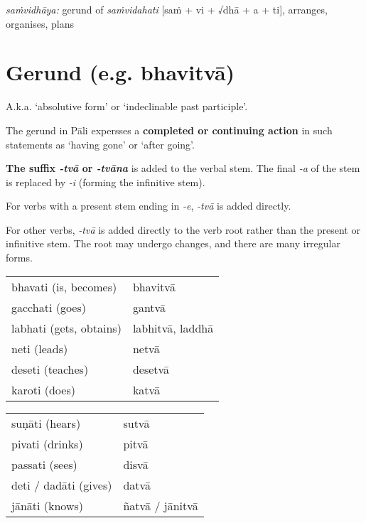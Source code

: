 \documentclass[11pt,oneside]{memoir}
\begin{document}
\emph{saṁvidhāya:} gerund of \emph{saṁvidahati} [saṁ + vi + √dhā + a + ti], arranges, organises, plans

\section{Gerund (e.g. bhavitvā)}
\label{sec:org36e360a}

A.k.a. `absolutive form' or `indeclinable past participle'.

The gerund in Pāli expersses a \textbf{completed or continuing action} in such statements as `having gone' or `after going'.

\textbf{The suffix \emph{-tvā} or \emph{-tvāna}} is added to the verbal stem. The final \emph{-a} of the
stem is replaced by \emph{-i} (forming the infinitive stem).

For verbs with a present stem ending in \emph{-e}, \emph{-tvā} is added directly.

For other verbs, \emph{-tvā} is added directly to the verb root rather than the
present or infinitive stem. The root may undergo changes, and there are many
irregular forms.

\bigskip
\begin{multicols}{2}

\begin{center}
\begin{tabular}{ll}
bhavati (is, becomes) & bhavitvā\\[0pt]
gacchati (goes) & gantvā\\[0pt]
labhati (gets, obtains) & labhitvā, laddhā\\[0pt]
neti (leads) & netvā\\[0pt]
deseti (teaches) & desetvā\\[0pt]
karoti (does) & katvā\\[0pt]
\end{tabular}
\end{center}

\columnbreak

\begin{center}
\begin{tabular}{ll}
suṇāti (hears) & sutvā\\[0pt]
pivati (drinks) & pitvā\\[0pt]
passati (sees) & disvā\\[0pt]
deti / dadāti (gives) & datvā\\[0pt]
jānāti (knows) & ñatvā / jānitvā\\[0pt]
\end{tabular}
\end{center}

\end{multicols}
\end{document}
